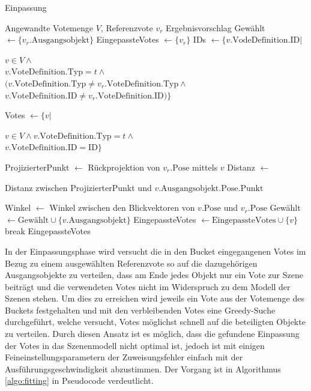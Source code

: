 \begin{algorithm}
  \caption{Einpassung}
  \small\label{algo:fitting}
  \begin{algorithmic}[1]
    \Require Angewandte Votemenge $V$, Referenzvote $v_r$\;
    \Ensure Ergebnisvorschlag\;
    \State Gewählt $\gets \{v_r.\text{Ausgangsobjekt}\}$\;
    \State EingepassteVotes $\gets \{v_r\}$\;
      \State IDs $\gets \{v.\text{VodeDefinition}.\text{ID} | $ \parbox[t]{\dimexpr\linewidth\relax}{$v \in V \wedge$\\
          $v.\text{VoteDefinition}.\text{Typ} = t \wedge$\\
          $(v.\text{VoteDefinition}.\text{Typ} \neq v_r.\text{VoteDefinition}.\text{Typ} \wedge$\\
          $v.\text{VoteDefinition}.\text{ID} \neq v_r.\text{VoteDefinition}.\text{ID})\}$}\strut\;
        \State Votes $\gets \{v | $\parbox[t]{\dimexpr\linewidth\relax}{$v \in V \wedge v.\text{VoteDefinition}.\text{Typ} = t \wedge$\\
            $v.\text{VoteDefinition}.\text{ID} = \text{ID}\}$}\strut\;
          \State ProjizierterPunkt $\gets$ Rückprojektion von $v_r.\text{Pose}$ mittels $v$\;
          \State Distanz $\gets$ \parbox[t]{\dimexpr\linewidth-1\algorithmicindent\relax}{Distanz zwischen ProjizierterPunkt und $v.\text{Ausgangsobjekt}.\text{Pose}.\text{Punkt}$}\strut\;
          \State Winkel $\gets$ Winkel zwischen den Blickvektoren von $v.\text{Pose}$ und $v_r.\text{Pose}$\;
            \State Gewählt $\gets \text{Gewählt} \cup \{v.\text{Ausgangsobjekt}\}$\;
            \State EingepassteVotes $\gets \text{EingepassteVotes} \cup \{v\}$\;
            \State break\;
          \EndIf
        \EndFor
      \EndFor
    \EndFor
    \State \Return EingepassteVotes\;
  \end{algorithmic}
\end{algorithm}

In der Einpassungsphase wird versucht die in den Bucket eingegangenen Votes im Bezug zu einem ausgewählten Referenzvote so auf die dazugehörigen Ausgangsobjekte zu verteilen, dass am Ende jedes Objekt nur ein Vote zur Szene beiträgt und die verwendeten Votes nicht im Widerspruch zu dem Modell der Szenen stehen.
Um dies zu erreichen wird jeweils ein Vote aus der Votemenge des Buckets festgehalten und mit den verbleibenden Votes eine Greedy-Suche durchgeführt, welche versucht, Votes möglichst schnell auf die beteiligten Objekte zu verteilen.
Durch diesen Ansatz ist es möglich, dass die gefundene Einpassung der Votes in das Szenenmodell nicht optimal ist, jedoch ist mit einigen Feineinstellungsparametern der Zuweisungsfehler einfach mit der Ausführungsgeschwindigkeit abzustimmen.
Der Vorgang ist in Algorithmus \vref{algo:fitting} in Pseudocode verdeutlicht.

